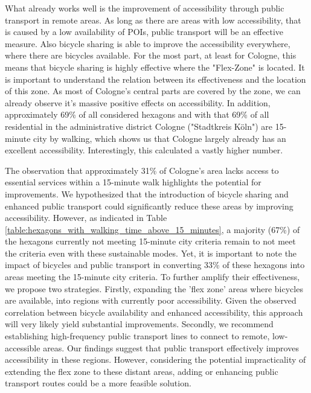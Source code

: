 What already works well is the improvement of accessibility through public transport in remote areas.
As long as there are areas with low accessibility, that is caused by a low availability of POIs, public transport will be an effective measure.
Also bicycle sharing is able to improve the accessibility everywhere, where there are bicycles available.
For the most part, at least for Cologne, this means that bicycle sharing is highly effective where the "Flex-Zone" is located.
It is important to understand the relation between its effectiveness and the location of this zone.
As most of Cologne's central parts are covered by the zone, we can already observe it's massive positive effects on accessibility.
In addition, approximately 69\% of all considered hexagons and with that 69\% of all residential in the administrative district Cologne ("Stadtkreis Köln") are 15-minute city by walking, which shows us that Cologne largely already has an excellent accessibility.
Interestingly, this  calculated a vastly higher number. 

The observation that approximately 31\% of Cologne's area lacks access to essential services within a 15-minute walk highlights the potential for improvements.
We hypothesized that the introduction of bicycle sharing and enhanced public transport could significantly reduce these areas by improving accessibility.
However, as indicated in Table \ref{table:hexagons_with_walking_time_above_15_minutes}, a majority (67\%) of the hexagons currently not meeting 15-minute city criteria remain to not meet the criteria even with these sustainable modes.
Yet, it is important to note the impact of bicycles and public transport in converting 33\% of these hexagons into areas meeting the 15-minute city criteria.
To further amplify their effectiveness, we propose two strategies.
Firstly, expanding the 'flex zone' areas where bicycles are available, into regions with currently poor accessibility. 
Given the observed correlation between bicycle availability and enhanced accessibility, this approach will very likely yield substantial improvements.
Secondly, we recommend establishing high-frequency public transport lines to connect to remote, low-accessible areas. 
Our findings suggest that public transport effectively improves accessibility in these regions. 
However, considering the potential impracticality of extending the flex zone to these distant areas, adding or enhancing public transport routes could be a more feasible solution.


